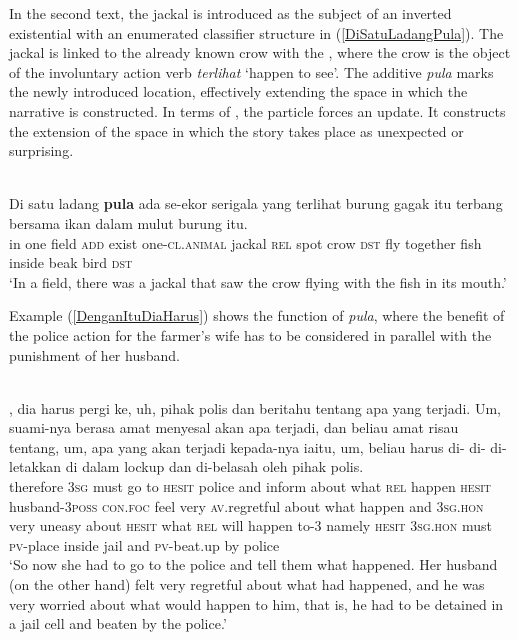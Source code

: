 \documentclass[output=paper
,modfonts
,nonflat]{langsci/langscibook}
\begin{document}
\noindent
In the second text, the jackal is introduced as the subject of an inverted existential  with an enumerated classifier structure in (\ref{DiSatuLadangPula}). The jackal is linked to the already known crow with the , where the crow is the object of the involuntary action verb \emph{terlihat} `happen to see'. The additive \emph{pula} marks the newly introduced location, effectively extending the space in which the narrative is constructed. In terms of , the particle forces an update. It constructs the extension of the space in which the story takes place as unexpected or surprising.

\ea\label{DiSatuLadangPula} 
\\
\gll 	Di satu ladang \textbf{pula}  ada    {\ob}se-ekor serigala{\cb} yang terlihat   {burung gagak} itu terbang bersama  ikan dalam mulut burung itu.\\
		in one  field  \textsc{add}  exist one-\textsc{cl.animal}   jackal    \textsc{rel}  spot crow         \textsc{dst} fly     together fish inside beak  bird   \textsc{dst}\\
	\glt `In a field, there was a jackal that saw the crow flying with the fish in its mouth.'
\z

\noindent
Example (\ref{DenganItuDiaHarus}) shows the  function of \emph{pula}, where the benefit of the police action for the farmer's wife has to be considered in parallel with the punishment of her husband.

\ea\label{DenganItuDiaHarus} 
\\
, dia harus pergi ke,  uh,   {pihak   polis}  dan  beritahu tentang apa  yang terjadi. Um,    {\ob}suami-nya        berasa amat menyesal  akan  apa  terjadi, dan  beliau  amat risau  tentang, um,   apa  yang akan terjadi kepada-nya      iaitu, um,   beliau  harus {di- di-} di-letakkan {di dalam} lockup dan  di-belasah      oleh {pihak polis}.\\
therefore   \textsc{3sg} must  go    to   \textsc{hesit} police and  inform   about   what \textsc{rel}  happen \textsc{hesit} husband-\textsc{3poss} \textsc{con.foc} feel   very \textsc{av.}regretful about what happen   and  \textsc{3sg.hon} very uneasy about \textsc{hesit} what \textsc{rel}  will happen  to-3      namely \textsc{hesit} \textsc{3sg.hon} must  {}  \textsc{pv-}place         inside jail   and  \textsc{pv-}beat.up by    police\\
\glt `So now she had to go to the police and tell them what happened. Her husband (on the other hand) felt very regretful about what had happened, and he was very worried about what would happen to him, that is, he had to be detained in a jail cell and beaten by the police.'
\z
\end{document}
